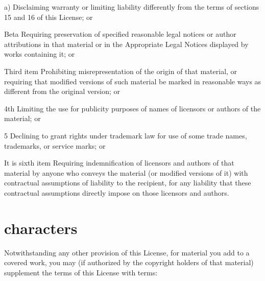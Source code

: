 \documentclass{article}
\begin{document}
\begin{Lpolylist}[fourth]

\item[a)] Disclaiming warranty or limiting liability differently from the terms of sections 15 and 16 of this License; or

\item[Beta] Requiring preservation of specified reasonable legal notices or author attributions in that material or in the Appropriate Legal Notices displayed by works containing it; or

\item[Third item] Prohibiting misrepresentation of the origin of that material, or requiring that modified versions of such material be marked in reasonable ways as different from the original version; or

\item[4th] Limiting the use for publicity purposes of names of licensors or authors of the material; or

\item[5] Declining to grant rights under trademark law for use of some trade names, trademarks, or service marks; or

\item[It is sixth item] Requiring indemnification of licensors and authors of that material by anyone who conveys the material (or modified versions of it) with contractual assumptions of liability to the recipient, for any liability that these contractual assumptions directly impose on those licensors and authors.

\end{Lpolylist}

\section{characters}

Notwithstanding any other provision of this License, for material you add to a covered work, you may (if authorized by the copyright holders of that material) supplement the terms of this License with terms:
\end{document}

